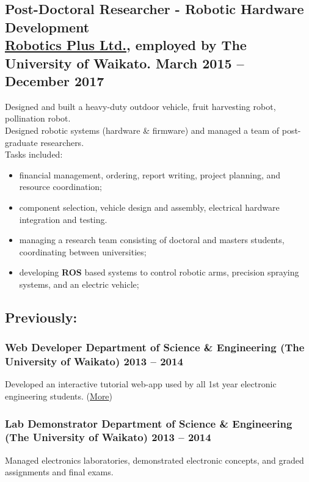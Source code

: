 \documentclass[english]{extarticle}
\begin{document}
\subsection*{Post-Doctoral Researcher - Robotic Hardware Development \\\textmd{\footnotesize \href{https://www.roboticsplus.co.nz/}{Robotics Plus Ltd.}, employed by The University of Waikato.\hfill{} \textbf{March 2015 -- December 2017}}}
Designed and built a heavy-duty outdoor vehicle, fruit harvesting robot, pollination robot.\\
Designed robotic systems (hardware \& firmware) and managed a team of post-graduate researchers.\\
Tasks included:
\begin{itemize}
    \item financial management, ordering, report writing, project planning, and resource coordination;
    \item component selection, vehicle design and assembly, electrical hardware integration and testing.
    \item managing a research team consisting of doctoral and masters students, coordinating between universities;
    \item developing \textbf{ROS} based systems to control robotic arms, precision spraying systems, and an electric vehicle;
\end{itemize}

\subsection*{Previously:}

\subsubsection*{Web Developer \textmd{\footnotesize Department of Science \& Engineering (The University of Waikato) \hfill{} \textbf{2013 -- 2014}}}
\vspace{-2mm}
Developed an interactive tutorial web-app used by all 1st year electronic engineering students. (\href{https://markhedleyjones.com/projects/electronics-tutorial-website}{More})

\subsubsection*{Lab Demonstrator \textmd{\footnotesize Department of Science \& Engineering (The University of Waikato) \hfill{} \textbf{2013 -- 2014}}}
\vspace{-2mm}
Managed electronics laboratories, demonstrated electronic concepts, and graded assignments and final exams.
\end{document}
